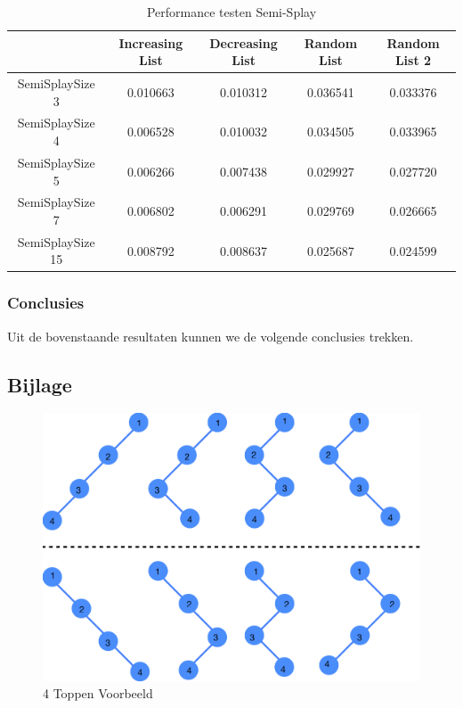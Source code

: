 \documentclass[dutch, 11pt]{report}
\begin{document}
\begin{table}[h]
    \centering
    \begin{tabular}{ |c|c|c|c|c| } 
     \hline
                        & Increasing List    & Decreasing List   & Random List  & Random List 2\\ 
        \hline
        SemiSplaySize 3       & 0.010663     	& 0.010312	& 0.036541 	& 0.033376	\\ 
        SemiSplaySize 4       & 0.006528	& 0.010032	& 0.034505 	& 0.033965	\\ 
        SemiSplaySize 5       & 0.006266	& 0.007438       & 0.029927 	& 0.027720	\\
        SemiSplaySize 7       & 0.006802	& 0.006291	& 0.029769 	& 0.026665	\\
        SemiSplaySize 15     & 0.008792	& 0.008637	& 0.025687 	& 0.024599	\\
     \hline
    \end{tabular}
    \caption{Performance testen Semi-Splay}
    \label{tab:config}
\end{table}

\subsubsection*{Conclusies}
Uit de bovenstaande resultaten kunnen we de volgende conclusies trekken.  

\newpage
\subsection*{Bijlage}

\begin{figure}[h]
\caption{4 Toppen Voorbeeld}
\includegraphics[scale=0.2, width=\textwidth]{4_Toppen}
\centering
\end{figure}
\end{document}
